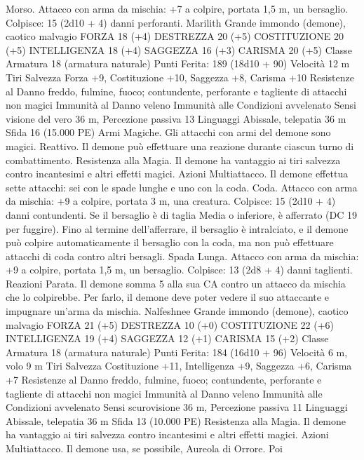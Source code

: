 \begin{multicols}{2}
Morso. Attacco con arma da mischia: +7 a colpire, portata 1,5
m, un bersaglio.
Colpisce: 15 (2d10 + 4) danni perforanti. 
Marilith
Grande immondo (demone), caotico malvagio
FORZA 18 (+4)
DESTREZZA 20 (+5)
COSTITUZIONE 20 (+5)
INTELLIGENZA 18 (+4)
SAGGEZZA 16 (+3)
CARISMA 20 (+5)
Classe Armatura 18 (armatura naturale)
\hspace*{0pt}\hfill{Punti Ferita}: 189 (18d10 + 90)
Velocità 12 m
Tiri Salvezza Forza +9, Costituzione +10, Saggezza +8, Carisma
+10
Resistenze al Danno freddo, fulmine, fuoco; contundente,
perforante e tagliente di attacchi non magici
Immunità al Danno veleno
Immunità alle Condizioni avvelenato
Sensi visione del vero 36 m, Percezione passiva 13
Linguaggi Abissale, telepatia 36 m
Sfida 16 (15.000 PE)
Armi Magiche. Gli attacchi con armi del demone sono magici.
Reattivo. Il demone può effettuare una reazione durante ciascun
turno di combattimento.
Resistenza alla Magia. Il demone ha vantaggio ai tiri salvezza
contro incantesimi e altri effetti magici.
Azioni
Multiattacco. Il demone effettua sette attacchi: sei con le spade
lunghe e uno con la coda.
Coda. Attacco con arma da mischia: +9 a colpire, portata 3 m,
una creatura.
Colpisce: 15 (2d10 + 4) danni contundenti. Se il bersaglio è di
taglia Media o inferiore, è afferrato (DC 19 per fuggire). Fino al
termine dell’afferrare, il bersaglio è intralciato, e il demone può
colpire automaticamente il bersaglio con la coda, ma non può
effettuare attacchi di coda contro altri bersagli.
Spada Lunga. Attacco con arma da mischia: +9 a colpire,
portata 1,5 m, un bersaglio.
Colpisce: 13 (2d8 + 4) danni taglienti.
Reazioni
Parata. Il demone somma 5 alla sua CA contro un attacco da
mischia che lo colpirebbe. Per farlo, il demone deve poter vedere
il suo attaccante e impugnare un’arma da mischia.
Nalfeshnee
Grande immondo (demone), caotico malvagio
FORZA 21 (+5)
DESTREZZA 10 (+0)
COSTITUZIONE 22 (+6)
INTELLIGENZA 19 (+4)
SAGGEZZA 12 (+1)
CARISMA 15 (+2)
Classe Armatura 18 (armatura naturale)
\hspace*{0pt}\hfill{Punti Ferita}: 184 (16d10 + 96)
Velocità 6 m, volo 9 m
Tiri Salvezza Costituzione +11, Intelligenza +9, Saggezza +6,
Carisma +7
Resistenze al Danno freddo, fulmine, fuoco; contundente,
perforante e tagliente di attacchi non magici
Immunità al Danno veleno
Immunità alle Condizioni avvelenato
Sensi scurovisione 36 m, Percezione passiva 11
Linguaggi Abissale, telepatia 36 m
Sfida 13 (10.000 PE)
Resistenza alla Magia. Il demone ha vantaggio ai tiri salvezza
contro incantesimi e altri effetti magici.
Azioni
Multiattacco. Il demone usa, se possibile, Aureola di Orrore. Poi

\end{multicols}
